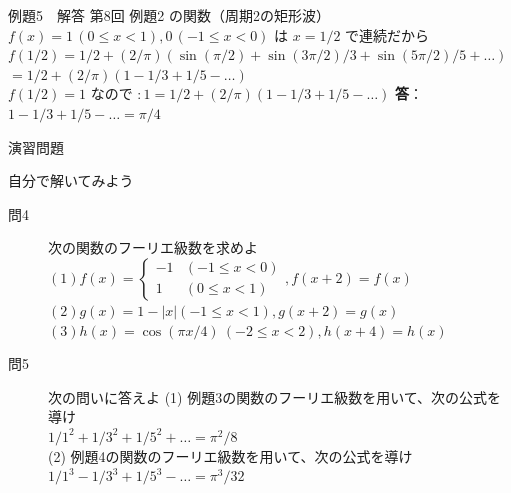 \documentclass[professionalfonts]{beamer}
\begin{document}
\begin{frame}{例題5　解答}
  第8回 例題2 の関数（周期2の矩形波）$f(x)=1\,(0\leq x<1), 0\,(-1\leq x<0)$ は $x=1/2$ で連続だから\\[4pt]
  $f(1/2) = 1/2 + (2/\pi)(\sin(\pi/2) + \sin(3\pi/2)/3 + \sin(5\pi/2)/5 + \ldots)$\\[4pt]
  $= 1/2 + (2/\pi)(1 - 1/3 + 1/5 - \ldots)$\\[4pt]
  $f(1/2) = 1$ なので $: 1 = 1/2 + (2/\pi)(1 - 1/3 + 1/5 - \ldots)$
  \medskip\textbf{答}：$1 - 1/3 + 1/5 - \ldots = \pi/4$
\end{frame}

\begin{frame}{演習問題}
  \begin{exampleblock}{自分で解いてみよう}
  \begin{description}
    \item[問4] 次の関数のフーリエ級数を求めよ
    $(1) f(x) = \begin{cases} -1 & (-1 \leq x < 0) \\ 1 & (0 \leq x < 1) \end{cases},  f(x+2) = f(x)$\\
    $(2) g(x) = 1 - |x|  (-1 \leq x < 1),  g(x+2) = g(x)$\\
    $(3) h(x) = \cos(\pi x/4) \ (-2 \leq x < 2),  h(x+4) = h(x)$\\
    \item[問5] 次の問いに答えよ
    (1) 例題3の関数のフーリエ級数を用いて、次の公式を導け\\
    $1/1^{2} + 1/3^{2} + 1/5^{2} + \ldots = \pi^{2}/8$\\
    (2) 例題4の関数のフーリエ級数を用いて、次の公式を導け\\
    $1/1^{3} - 1/3^{3} + 1/5^{3} - \ldots = \pi^{3}/32$\\
  \end{description}
  \end{exampleblock}
\end{frame}
\end{document}
